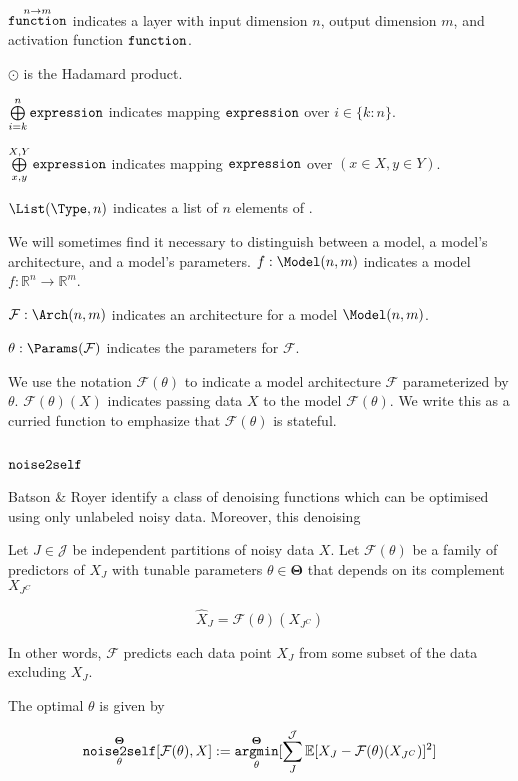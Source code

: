 $\mathop{\mathtt{function}}\limits^{n \to m}$ indicates a layer with input dimension $n$, output dimension $m$, and activation function $\mathop{\mathtt{function}}\limits$.

$\odot$ is the Hadamard product.

$\mathop{\bigoplus}\limits^n_{i=k}\mathop{\mathtt{expression}}\limits$ indicates mapping $\mathop{\mathtt{expression}}\limits$ over $i \in \{k:n\}$.

$\mathop{\bigoplus}\limits^{X,Y}_{x,y}\mathop{\mathtt{expression}}\limits$ indicates mapping $\mathop{\mathtt{expression}}\limits$ over $(x \in X,y \in Y)$.

$\List(\Type,n)$ indicates a list of $n$ elements of \Type.

We will sometimes find it necessary to distinguish between a model, a model's architecture, and a model's parameters.
$f:\Model(n,m)$ indicates a model $f:\mathbb{R}^n \to \mathbb{R}^m$.

$\mathcal{F}:\Arch(n,m)$ indicates an architecture for a model $\Model(n,m)$.

$\theta:\Params(\mathcal{F})$ indicates the parameters for $\mathcal{F}$.

We use the notation $\mathcal{F}(\theta)$ to indicate a model architecture $\mathcal{F}$ parameterized by $\theta$.
$\mathcal{F}(\theta)(X)$ indicates passing data $X$ to the model $\mathcal{F}(\theta)$.
We write this as a curried function to emphasize that $\mathcal{F}(\theta)$ is stateful.


\subsection{$\mathop{\mathtt{noise2self}}\limits$}

Batson \& Royer\cite{batson2019noise2self} identify a class of denoising functions which can be optimised using only unlabeled noisy data.
Moreover, this denoising 

Let $J \in \mathcal{J}$ be independent partitions of noisy data $X$. Let $\mathcal{F}(\theta)$ be a family of predictors of $X_J$ with tunable parameters $\theta \in \mathbf{\Theta}$ that depends on its complement $X_{J^C}$

\begin{equation}
  \hat{X}_J=\mathcal{F}(\theta)(X_{J^C})
\end{equation}

In other words, $\mathcal{F}$ predicts each data point $X_J$ from some subset of the data excluding $X_J$. 

  The optimal $\theta$ is given by

\begin{equation}
  \mathop{\mathtt{noise2self}}\limits_\theta^{\mathbf{\Theta}}[\mathcal{F}(\theta),X] := \mathop{\mathtt{argmin}}\limits_\theta^{\mathbf{\Theta}}[\sum_{J}^{\mathcal{J}}\mathbb{E}[X_J-\mathcal{F}(\theta)(X_{J^C})]^2]
\end{equation}



